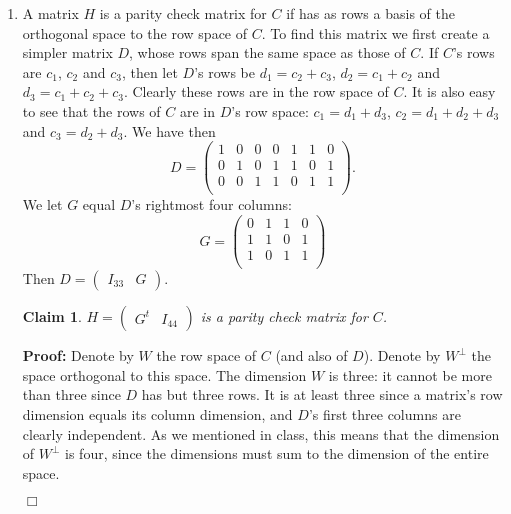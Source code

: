 \documentclass[11pt]{article} \usepackage{amssymb}
\newtheorem{claim}[theorem]{Claim}
\newenvironment{proof}{\noindent \textbf{Proof:}}{$\Box$}
\begin{document}
\begin{enumerate}
\begin{enumerate}
    \item
      A matrix $H$ is a parity check matrix for $C$ if has as rows a basis 
      of the orthogonal
      space to the row space of $C$. To find this matrix we first create a 
      simpler matrix $D$, whose rows span the same space as those of $C$. If $C$'s
      rows are $c_1$, $c_2$ and $c_3$, then let $D$'s rows be $d_1=c_2+c_3$, 
      $d_2=c_1+c_2$ and $d_3=c_1+c_2+c_3$. Clearly these rows are in the row 
      space of $C$. It is
      also easy to see that the rows of $C$ are in $D$'s row space:
      $c_1=d_1+d_3$, $c_2=d_1+d_2+d_3$ and $c_3=d_2+d_3$. We have then
      \begin{equation*}
        D=
        \begin{pmatrix}
          1 & 0 & 0 & 0 & 1 & 1 & 0\\
          0 & 1 & 0 & 1 & 1 & 0 & 1\\
          0 & 0 & 1 & 1 & 0 & 1 & 1\\
        \end{pmatrix}.
      \end{equation*}
      We let $G$ equal $D$'s rightmost four columns:
      \begin{equation*}
        G=
        \begin{pmatrix}
          0 & 1 & 1 & 0\\
          1 & 1 & 0 & 1\\
          1 & 0 & 1 & 1\\
        \end{pmatrix}
      \end{equation*}
      Then $D=\begin{pmatrix}I_{33}& G\end{pmatrix}$.

      \begin{claim}
        $H=\begin{pmatrix}G^t & I_{44}\end{pmatrix}$ is a parity check 
        matrix for $C$.
      \end{claim}
      \begin{proof}
        Denote by $W$ the row space of $C$ (and also of $D$). Denote by
        $W^\bot$ the space orthogonal to this space. 
        The dimension $W$ is three: it cannot be more than
        three since $D$ has but three rows. It is at least three since a
        matrix's row dimension equals its column dimension, and $D$'s first
        three columns are clearly independent. As we mentioned in class, this
        means that the dimension of $W^\bot$ is four, since the dimensions
        must sum to the dimension of the entire space.


\end{proof}
\end{enumerate}
\end{enumerate}
\end{document}
